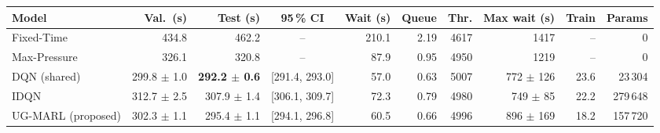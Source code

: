 \begin{tabular}{lrrcrrrrrr}
\toprule
Model & Val.\ (s) & Test (s) & 95\,\% CI & Wait (s) & Queue & Thr. & Max wait (s) & Train & Params \\
\midrule
Fixed-Time & 434.8 & 462.2 & -- & 210.1 & 2.19 & 4617 & 1417 & -- & 0 \\
Max-Pressure & 326.1 & 320.8 & -- & 87.9 & 0.95 & 4950 & 1219 & -- & 0 \\
\midrule
DQN (shared) & 299.8 $\pm$ 1.0 & \textbf{292.2 $\pm$ 0.6} & [291.4, 293.0] & 57.0 & 0.63 & 5007 & 772 $\pm$ 126 & 23.6 & 23\,304 \\
IDQN & 312.7 $\pm$ 2.5 & 307.9 $\pm$ 1.4 & [306.1, 309.7] & 72.3 & 0.79 & 4980 & 749 $\pm$ 85 & 22.2 & 279\,648 \\
\midrule
UG-MARL (proposed) & 302.3 $\pm$ 1.1 & 295.4 $\pm$ 1.1 & [294.1, 296.8] & 60.5 & 0.66 & 4996 & 896 $\pm$ 169 & 18.2 & 157\,720 \\
\bottomrule
\end{tabular}

